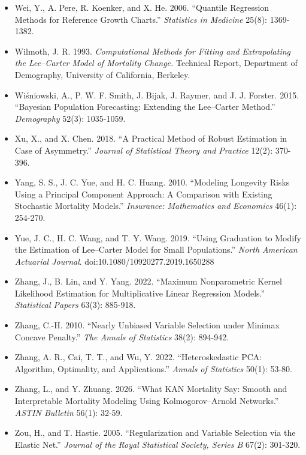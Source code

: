 \documentclass[UTF8, fontset=macnew, a4paper, 12pt]{ctexart}
\begin{document}
\begin{itemize}[leftmargin=2em, label={}, itemsep=3pt]
  \item[] Wei, Y., A. Pere, R. Koenker, and X. He. 2006. ``Quantile Regression
        Methods for Reference Growth Charts.'' \textit{Statistics in Medicine}
        25(8): 1369-1382.
  \item[] Wilmoth, J. R. 1993. \textit{Computational Methods for Fitting and
        Extrapolating the Lee--Carter Model of Mortality Change.} Technical
        Report, Department of Demography, University of California, Berkeley.
  \item[] Wi\'sniowski, A., P. W. F. Smith, J. Bijak, J. Raymer, and
        J. J. Forster. 2015. ``Bayesian Population Forecasting: Extending the
        Lee--Carter Method.'' \textit{Demography} 52(3): 1035-1059.
  \item[] Xu, X., and X. Chen. 2018. ``A Practical Method of Robust Estimation
        in Case of Asymmetry.'' \textit{Journal of Statistical Theory and
        Practice} 12(2): 370-396.
  \item[] Yang, S. S., J. C. Yue, and H. C. Huang. 2010. ``Modeling Longevity
        Risks Using a Principal Component Approach: A Comparison with Existing
        Stochastic Mortality Models.''
        \textit{Insurance: Mathematics and Economics} 46(1): 254-270.
  \item[] Yue, J. C., H. C. Wang, and T. Y. Wang. 2019. ``Using Graduation to
        Modify the Estimation of Lee--Carter Model for Small Populations.''
        \textit{North American Actuarial Journal}.
        doi:10.1080/10920277.2019.1650288
  \item[] Zhang, J., B. Lin, and Y. Yang. 2022. ``Maximum Nonparametric Kernel
        Likelihood Estimation for Multiplicative Linear Regression Models.''
        \textit{Statistical Papers} 63(3): 885-918.
  \item[] Zhang, C.-H. 2010. ``Nearly Unbiased Variable Selection under
        Minimax Concave Penalty.'' \textit{The Annals of Statistics}
        38(2): 894-942.
  \item[] Zhang, A. R., Cai, T. T., and Wu, Y. 2022. ``Heteroskedastic PCA: Algorithm,
        Optimality, and Applications.'' \textit{Annals of Statistics} 50(1): 53-80.
  \item[] Zhang, L., and Y. Zhuang. 2026. ``What KAN Mortality Say: Smooth and
        Interpretable Mortality Modeling Using Kolmogorov--Arnold Networks.''
        \textit{ASTIN Bulletin} 56(1): 32-59.
  \item[] Zou, H., and T. Hastie. 2005. ``Regularization and Variable Selection
        via the Elastic Net.'' \textit{Journal of the Royal Statistical
        Society, Series B} 67(2): 301-320.


\end{itemize}
\end{document}
